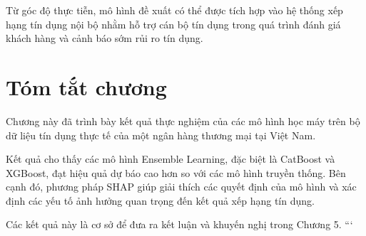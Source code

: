 Từ góc độ thực tiễn, mô hình đề xuất có thể được tích hợp vào hệ thống xếp hạng tín dụng nội bộ nhằm hỗ trợ cán bộ tín dụng trong quá trình đánh giá khách hàng và cảnh báo sớm rủi ro tín dụng.

\section{Tóm tắt chương}

Chương này đã trình bày kết quả thực nghiệm của các mô hình học máy trên bộ dữ liệu tín dụng thực tế của một ngân hàng thương mại tại Việt Nam.

Kết quả cho thấy các mô hình Ensemble Learning, đặc biệt là CatBoost và XGBoost, đạt hiệu quả dự báo cao hơn so với các mô hình truyền thống. Bên cạnh đó, phương pháp SHAP giúp giải thích các quyết định của mô hình và xác định các yếu tố ảnh hưởng quan trọng đến kết quả xếp hạng tín dụng.

Các kết quả này là cơ sở để đưa ra kết luận và khuyến nghị trong Chương 5.
```
